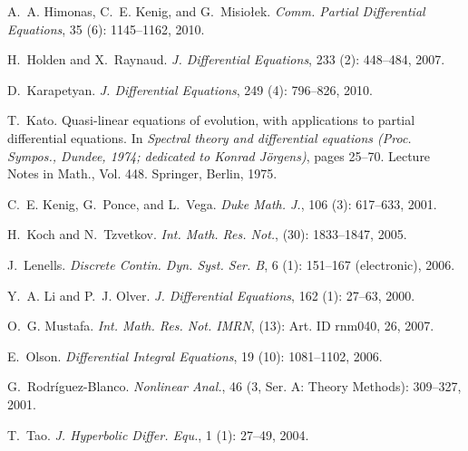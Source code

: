 \documentclass[final]{thesis}
\begin{document}
\begin{thebibliography}{35}
A.~A. Himonas, C.~E. Kenig, and G.~Misio{\l}ek.
\newblock \emph{Comm. Partial Differential Equations}, 35
  (6): 1145--1162, 2010.

H.~Holden and X.~Raynaud.
\newblock \emph{J. Differential Equations}, 233 (2):
  448--484, 2007.

D.~Karapetyan.
\newblock \emph{J. Differential Equations}, 249 (4):
  796--826, 2010.

T.~Kato.
\newblock Quasi-linear equations of evolution, with applications to partial
  differential equations.
\newblock In \emph{Spectral theory and differential equations ({P}roc.
  {S}ympos., {D}undee, 1974; dedicated to {K}onrad {J}{\"o}rgens)}, pages
  25--70. Lecture Notes in Math., Vol. 448. Springer, Berlin, 1975.

C.~E. Kenig, G.~Ponce, and L.~Vega.
\newblock \emph{Duke Math. J.}, 106 (3): 617--633, 2001.

H.~Koch and N.~Tzvetkov.
\newblock \emph{Int. Math. Res. Not.},  (30): 1833--1847,
  2005.

J.~Lenells.
\newblock \emph{Discrete Contin. Dyn. Syst. Ser. B}, 6 (1):
  151--167 (electronic), 2006.

Y.~A. Li and P.~J. Olver.
\newblock \emph{J. Differential Equations}, 162 (1): 27--63,
  2000.

O.~G. Mustafa.
\newblock \emph{Int. Math. Res. Not. IMRN},  (13): Art. ID
  rnm040, 26, 2007.

E.~Olson.
\newblock \emph{Differential Integral Equations}, 19 (10):
  1081--1102, 2006.

G.~Rodr\'iguez-Blanco.
\newblock \emph{Nonlinear Anal.}, 46 (3, Ser. A: Theory
  Methods): 309--327, 2001.

T.~Tao.
\newblock \emph{J. Hyperbolic Differ. Equ.}, 1 (1): 27--49,
  2004.


\end{thebibliography}
\end{document}
